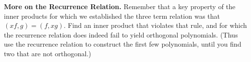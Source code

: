 \textbf{More on the Recurrence Relation.} Remember that a key property
of the inner products for which we established the three term relation
was that $(xf,g) = (f,xg)$. Find an inner product that violates that
rule, and for which the recurrence relation does indeed fail to yield
orthogonal polynomials. (Thus use the recurrence relation to construct
the first few polynomials, until you find two that are not orthogonal.)
